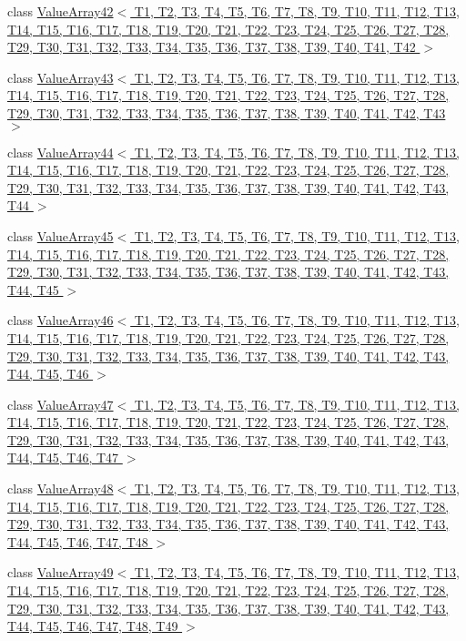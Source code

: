 \begin{DoxyCompactItemize}
\item 
class \hyperlink{classtesting_1_1internal_1_1ValueArray42}{\-Value\-Array42$<$ T1, T2, T3, T4, T5, T6, T7, T8, T9, T10, T11, T12, T13, T14, T15, T16, T17, T18, T19, T20, T21, T22, T23, T24, T25, T26, T27, T28, T29, T30, T31, T32, T33, T34, T35, T36, T37, T38, T39, T40, T41, T42 $>$}
\item 
class \hyperlink{classtesting_1_1internal_1_1ValueArray43}{\-Value\-Array43$<$ T1, T2, T3, T4, T5, T6, T7, T8, T9, T10, T11, T12, T13, T14, T15, T16, T17, T18, T19, T20, T21, T22, T23, T24, T25, T26, T27, T28, T29, T30, T31, T32, T33, T34, T35, T36, T37, T38, T39, T40, T41, T42, T43 $>$}
\item 
class \hyperlink{classtesting_1_1internal_1_1ValueArray44}{\-Value\-Array44$<$ T1, T2, T3, T4, T5, T6, T7, T8, T9, T10, T11, T12, T13, T14, T15, T16, T17, T18, T19, T20, T21, T22, T23, T24, T25, T26, T27, T28, T29, T30, T31, T32, T33, T34, T35, T36, T37, T38, T39, T40, T41, T42, T43, T44 $>$}
\item 
class \hyperlink{classtesting_1_1internal_1_1ValueArray45}{\-Value\-Array45$<$ T1, T2, T3, T4, T5, T6, T7, T8, T9, T10, T11, T12, T13, T14, T15, T16, T17, T18, T19, T20, T21, T22, T23, T24, T25, T26, T27, T28, T29, T30, T31, T32, T33, T34, T35, T36, T37, T38, T39, T40, T41, T42, T43, T44, T45 $>$}
\item 
class \hyperlink{classtesting_1_1internal_1_1ValueArray46}{\-Value\-Array46$<$ T1, T2, T3, T4, T5, T6, T7, T8, T9, T10, T11, T12, T13, T14, T15, T16, T17, T18, T19, T20, T21, T22, T23, T24, T25, T26, T27, T28, T29, T30, T31, T32, T33, T34, T35, T36, T37, T38, T39, T40, T41, T42, T43, T44, T45, T46 $>$}
\item 
class \hyperlink{classtesting_1_1internal_1_1ValueArray47}{\-Value\-Array47$<$ T1, T2, T3, T4, T5, T6, T7, T8, T9, T10, T11, T12, T13, T14, T15, T16, T17, T18, T19, T20, T21, T22, T23, T24, T25, T26, T27, T28, T29, T30, T31, T32, T33, T34, T35, T36, T37, T38, T39, T40, T41, T42, T43, T44, T45, T46, T47 $>$}
\item 
class \hyperlink{classtesting_1_1internal_1_1ValueArray48}{\-Value\-Array48$<$ T1, T2, T3, T4, T5, T6, T7, T8, T9, T10, T11, T12, T13, T14, T15, T16, T17, T18, T19, T20, T21, T22, T23, T24, T25, T26, T27, T28, T29, T30, T31, T32, T33, T34, T35, T36, T37, T38, T39, T40, T41, T42, T43, T44, T45, T46, T47, T48 $>$}
\item 
class \hyperlink{classtesting_1_1internal_1_1ValueArray49}{\-Value\-Array49$<$ T1, T2, T3, T4, T5, T6, T7, T8, T9, T10, T11, T12, T13, T14, T15, T16, T17, T18, T19, T20, T21, T22, T23, T24, T25, T26, T27, T28, T29, T30, T31, T32, T33, T34, T35, T36, T37, T38, T39, T40, T41, T42, T43, T44, T45, T46, T47, T48, T49 $>$}

\end{DoxyCompactItemize}

